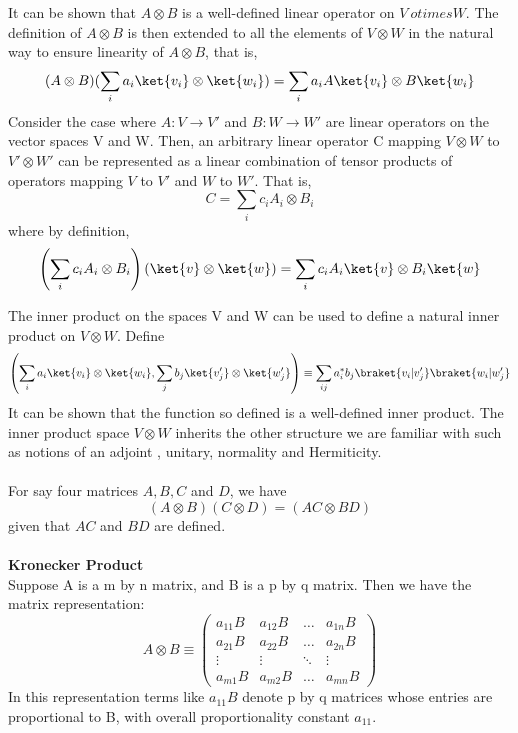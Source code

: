 \documentclass[12pt, oneside]{book}
\theoremstyle{definition}
\theoremstyle{definition}
\theoremstyle{remark}
\begin{document}
It can be shown that $A \otimes B$ is a well-defined linear operator on $V\ otimes W$. The definition of $A \otimes B$ is then extended to all the elements of $V \otimes W$ in the natural way to ensure linearity of $A \otimes B$, that is,
\[ (A \otimes B)(\sum_{i} a_{i} \ket{v_i} \otimes \ket{w_i}) = \sum_{i} a_i A\ket{v_i} \otimes B\ket{w_i} \]
Consider the case where $A:V \rightarrow V'$ and $B:W \rightarrow W'$ are linear operators on the vector spaces V and W. Then, 
an arbitrary linear operator C mapping $V \otimes W$ to $V' \otimes W'$ can be represented as a linear combination of tensor products of operators mapping 
$V$ to $V'$ and $W$ to $W'$. That is,
\[ C=\sum_{i} c_{i} A_i \otimes B_i \]
where by definition,
\[ \left( \sum_i c_i A_i \otimes B_i\right) \left(\ket{v} \otimes \ket{w}\right) = \sum_i c_i A_i \ket{v} \otimes B_i \ket{w} \]

The inner product on the spaces V and W can be used to define a natural inner product on $V \otimes W$. Define
\[ \left( \sum_i a_i\ket{v_i}\otimes \ket{w_i}, \sum_j b_j \ket{v'_j} \otimes \ket{w'_j}\right) \equiv \sum_{ij} a_i^*b_j\braket{v_i|v'_j}\braket{w_i|w'_j} \]
It can be shown that the function so defined is a well-defined inner product. The inner product space $V \otimes W$ inherits the other structure we are familiar with such as notions of an adjoint , unitary, normality and Hermiticity.\\
\\
For say four matrices $A,B,C$ and $D$, we have
\[
    (A\otimes B)(C\otimes D)=(AC\otimes BD)
\]
given that $AC$ and $BD$ are defined.\\
\\
\textbf{Kronecker Product}\\
Suppose A is a m by n matrix, and B is a p by q matrix. Then we have the matrix representation:
\[ A \otimes B \equiv \begin{pmatrix} a_{11}B & a_{12}B & \ldots & a_{1n}B \\ a_{21}B & a_{22}B & \ldots & a_{2n}B \\ \vdots & \vdots & \ddots & \vdots \\ a_{m1}B & a_{m2}B & \ldots & a_{mn}B \end{pmatrix} \]
In this representation terms like $a_11B$ denote p by q matrices whose entries are proportional to B, with overall proportionality constant $a_{11}$. 
\end{document}
